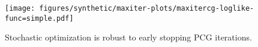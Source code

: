 \begin{figure}[t!]
  \centering
  \texttt{[image: figures/synthetic/maxiter-plots/maxitercg-loglike-func=simple.pdf]}
  \caption{Stochastic optimization is robust to early stopping PCG iterations.
  }
  \label{fig:pcg-iter}
\end{figure}
